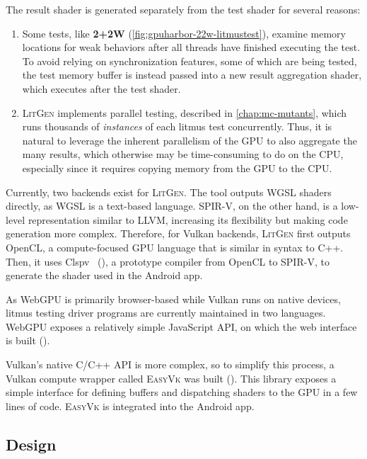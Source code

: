 The result shader is generated separately from the test shader for several reasons:
\begin{enumerate}
    \item Some tests, like \textbf{2+2W} (\myfig\ref{fig:gpuharbor-22w-litmustest}), examine memory locations for weak behaviors after all threads have finished executing the test. To avoid relying on synchronization features, some of which are being tested, the test memory buffer is instead passed into a new result aggregation shader, which executes after the test shader.
    \item \textsc{LitGen} implements parallel testing, described in \mychap\ref{chap:mc-mutants}, which runs thousands of \textit{instances} of each litmus test concurrently. Thus, it is natural to leverage the inherent parallelism of the GPU to also aggregate the many results, which otherwise may be time-consuming to do on the CPU, especially since it requires copying memory from the GPU to the CPU.
\end{enumerate}

Currently, two backends exist for \textsc{LitGen}. The tool outputs WGSL shaders directly, as WGSL is a text-based language. SPIR-V, on the other hand, is a low-level representation similar to LLVM, increasing its flexibility but making code generation more complex. Therefore, for Vulkan backends, \textsc{LitGen} first outputs OpenCL, a compute-focused GPU language that is similar in syntax to C++. Then, it uses Clspv~\cite{clspv} (), a prototype compiler from OpenCL to SPIR-V, to generate the shader used in the Android app.

As WebGPU is primarily browser-based while Vulkan runs on native devices, litmus testing driver programs are currently maintained in two languages. WebGPU exposes a relatively simple JavaScript API, on which the web interface is built ().

Vulkan's native C/C++ API is more complex, so to simplify this process, a Vulkan compute wrapper called \textsc{EasyVk} was built (). This library exposes a simple interface for defining buffers and dispatching shaders to the GPU in a few lines of code. \textsc{EasyVk} is integrated into the Android app.

\subsection{\gpuharbor Design \label{sec:gpuharbor-website-design}}

